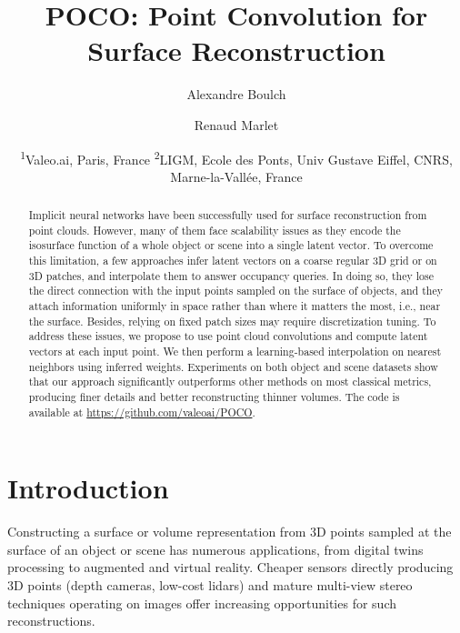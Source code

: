 \documentclass[10pt,twocolumn,letterpaper]{article}
\newcommand\OURS{{POCO}}
\newcommand{\titletext}{\OURS: Point Convolution for Surface Reconstruction}
\begin{document}
\title{\titletext}

\author{
Alexandre Boulch
\and 
Renaud Marlet
\and
\large
\hspace{-3mm}\textsuperscript{1}Valeo.ai, Paris, France  \hspace{1mm} \textsuperscript{2}LIGM, Ecole des Ponts, Univ Gustave Eiffel, CNRS, Marne-la-Vall\'ee, France
}

\maketitle

\begin{abstract}
Implicit neural networks have been successfully used for surface reconstruction from point clouds. However, many of them face scalability issues as they encode the isosurface function of a whole object or scene into a single latent vector. To overcome this limitation, a few approaches infer latent vectors on a coarse regular 3D grid or on 3D patches, and interpolate them to answer occupancy queries. In doing so, they lose the direct connection with the input points sampled on the surface of objects, and they attach information uniformly in space rather than where it matters the most, i.e., near the surface. Besides, relying on fixed patch sizes may require discretization tuning. To address these issues, we propose to use point cloud convolutions and compute latent vectors at each input point. We then perform a learning-based interpolation on nearest neighbors using inferred weights. Experiments on both object and scene datasets show that our approach significantly outperforms other methods on most classical metrics, producing finer details and better reconstructing thinner volumes.
The code is available at \url{https://github.com/valeoai/POCO}. \end{abstract}

\section{Introduction}

Constructing a surface or volume representation from 3D points sampled at the surface of an object or scene has numerous applications, from digital twins processing to augmented and virtual reality. Cheaper sensors directly producing 3D points (depth cameras, low-cost lidars) and
mature multi-view stereo techniques \cite{Schoenberger2016CVPR,Schoenberger2016ECCV} operating on images offer increasing opportunities for such reconstructions.
\end{document}
